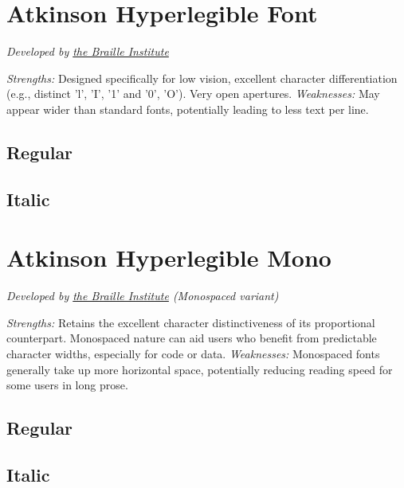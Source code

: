 \section{Atkinson Hyperlegible Font}\label{trouble6}
\emph{Developed by \href{https://brailleinstitute.org/freefont}{the Braille Institute}}
\begin{raggedright}
\emph{Strengths:} Designed specifically for low vision, excellent character differentiation (e.g., distinct 'l', 'I', '1' and '0', 'O'). Very open apertures.
\emph{Weaknesses:} May appear wider than standard fonts, potentially leading to less text per line.

\subsection{Regular}
\FontSample{\atkinsonhyperlegiblefont}

\subsection{Italic}
\FontSample{{\atkinsonhyperlegiblefont\itshape}}
\end{raggedright}


\pagebreak
\section{Atkinson Hyperlegible Mono}\label{troubleAtkinsonMono}
\emph{Developed by \href{https://brailleinstitute.org/freefont}{the Braille Institute} (Monospaced variant)}
\begin{raggedright}
\emph{Strengths:} Retains the excellent character distinctiveness of its proportional counterpart. Monospaced nature can aid users who benefit from predictable character widths, especially for code or data.
\emph{Weaknesses:} Monospaced fonts generally take up more horizontal space, potentially reducing reading speed for some users in long prose.

\subsection{Regular}
\FontSample{\atkinsonmonofont}

\subsection{Italic}
\FontSample{{\atkinsonmonofont\itshape}}
\end{raggedright}


